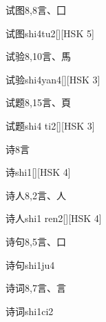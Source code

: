 \begin{entry}{试图}{8,8}{⾔、⼞}
  \begin{phonetics}{试图}{shi4tu2}[][HSK 5]
  \end{phonetics}
\end{entry}

\begin{entry}{试验}{8,10}{⾔、⾺}
  \begin{phonetics}{试验}{shi4yan4}[][HSK 3]
  \end{phonetics}
\end{entry}

\begin{entry}{试题}{8,15}{⾔、⾴}
  \begin{phonetics}{试题}{shi4 ti2}[][HSK 3]
  \end{phonetics}
\end{entry}

\begin{entry}{诗}{8}{⾔}
  \begin{phonetics}{诗}{shi1}[][HSK 4]
  \end{phonetics}
\end{entry}

\begin{entry}{诗人}{8,2}{⾔、⼈}
  \begin{phonetics}{诗人}{shi1 ren2}[][HSK 4]
  \end{phonetics}
\end{entry}

\begin{entry}{诗句}{8,5}{⾔、⼝}
  \begin{phonetics}{诗句}{shi1ju4}
  \end{phonetics}
\end{entry}

\begin{entry}{诗词}{8,7}{⾔、⾔}
  \begin{phonetics}{诗词}{shi1ci2}
  \end{phonetics}
\end{entry}

